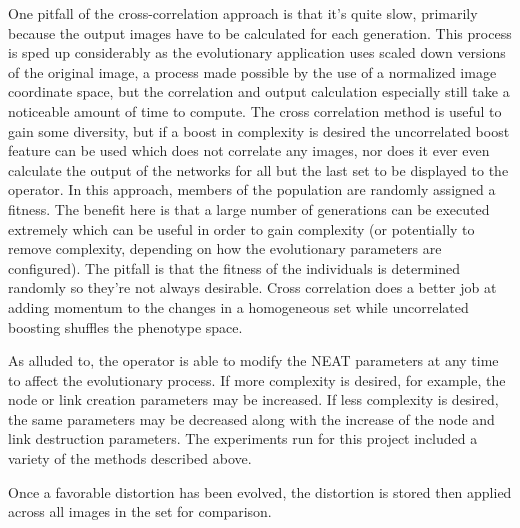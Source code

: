 One pitfall of the cross-correlation approach is that it's quite slow, primarily because the output images have to be calculated for each generation. This process is sped up considerably as the evolutionary application uses scaled down versions of the original image, a process made possible by the use of a normalized image coordinate space, but the correlation and output calculation especially still take a noticeable amount of time to compute. The cross correlation method is useful to gain some diversity, but if a boost in complexity is desired the uncorrelated boost feature can be used which does not correlate any images, nor does it ever even calculate the output of the networks for all but the last set to be displayed to the operator. In this approach, members of the population are randomly assigned a fitness. The benefit here is that a large number of generations can be executed extremely which can be useful in order to gain complexity (or potentially to remove complexity, depending on how the evolutionary parameters are configured). The pitfall is that the fitness of the individuals is determined randomly so they're not always desirable. Cross correlation does a better job at adding momentum to the changes in a homogeneous set while uncorrelated boosting shuffles the phenotype space.

As alluded to, the operator is able to modify the NEAT parameters at any time to affect the evolutionary process. If more complexity is desired, for example, the node or link creation parameters may be increased. If less complexity is desired, the same parameters may be decreased along with the increase of the node and link destruction parameters. The experiments run for this project included a variety of the methods described above.

Once a favorable distortion has been evolved, the distortion is stored then applied across all images in the set for comparison.